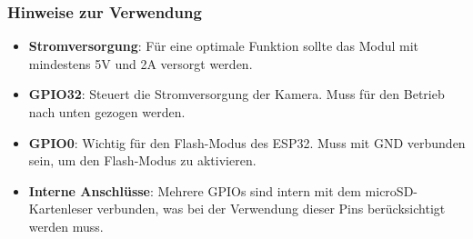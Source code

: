 \documentclass{vorlage-design-main}
\begin{document}
\hypertarget{hinweise-zur-verwendung}{%
\subsubsection{Hinweise zur Verwendung}\label{hinweise-zur-verwendung}}

\begin{itemize}

\item
  \textbf{Stromversorgung}: Für eine optimale Funktion sollte das Modul
  mit mindestens 5V und 2A versorgt werden.
\item
  \textbf{GPIO32}: Steuert die Stromversorgung der Kamera. Muss für den
  Betrieb nach unten gezogen werden.
\item
  \textbf{GPIO0}: Wichtig für den Flash-Modus des ESP32. Muss mit GND
  verbunden sein, um den Flash-Modus zu aktivieren.
\item
  \textbf{Interne Anschlüsse}: Mehrere GPIOs sind intern mit dem
  microSD-Kartenleser verbunden, was bei der Verwendung dieser Pins
  berücksichtigt werden muss.
\end{itemize}
\end{document}
